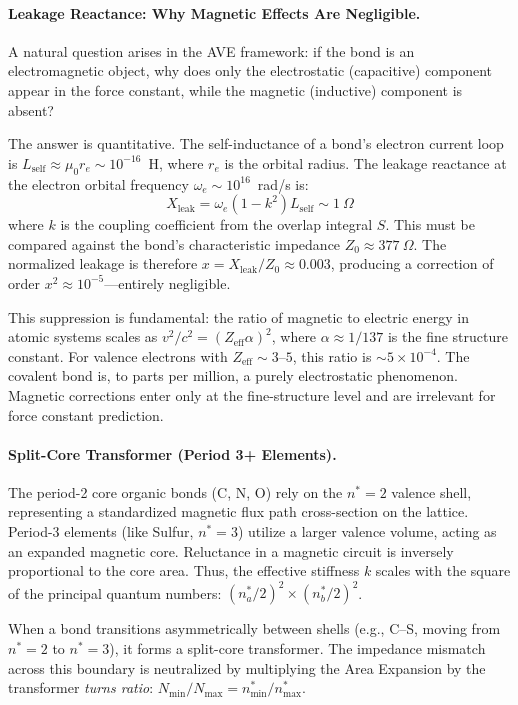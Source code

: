 \paragraph{Leakage Reactance: Why Magnetic Effects Are Negligible.}
A natural question arises in the AVE framework: if the bond is an electromagnetic object, why does only the electrostatic (capacitive) component appear in the force constant, while the magnetic (inductive) component is absent?

The answer is quantitative. The self-inductance of a bond's electron current loop is $L_\text{self} \approx \mu_0 r_e \sim 10^{-16}$~H, where $r_e$ is the orbital radius. The leakage reactance at the electron orbital frequency $\omega_e \sim 10^{16}$~rad/s is:
\begin{equation}
    X_\text{leak} = \omega_e (1 - k^2) L_\text{self} \sim 1~\Omega
    \label{eq:leakage_reactance}
\end{equation}
where $k$ is the coupling coefficient from the overlap integral $S$. This must be compared against the bond's characteristic impedance $Z_0 \approx 377~\Omega$. The normalized leakage is therefore $x = X_\text{leak}/Z_0 \approx 0.003$, producing a correction of order $x^2 \approx 10^{-5}$---entirely negligible.

This suppression is fundamental: the ratio of magnetic to electric energy in atomic systems scales as $v^2/c^2 = (Z_\text{eff} \alpha)^2$, where $\alpha \approx 1/137$ is the fine structure constant. For valence electrons with $Z_\text{eff} \sim 3\text{--}5$, this ratio is $\sim 5 \times 10^{-4}$. The covalent bond is, to parts per million, a purely electrostatic phenomenon. Magnetic corrections enter only at the fine-structure level and are irrelevant for force constant prediction.

\paragraph{Split-Core Transformer (Period 3+ Elements).}
The period-2 core organic bonds (C, N, O) rely on the $n^*=2$ valence shell, representing a standardized magnetic flux path cross-section on the lattice. Period-3 elements (like Sulfur, $n^*=3$) utilize a larger valence volume, acting as an expanded magnetic core. Reluctance in a magnetic circuit is inversely proportional to the core area. Thus, the effective stiffness $k$ scales with the square of the principal quantum numbers: $(n^*_a/2)^2 \times (n^*_b/2)^2$.

When a bond transitions asymmetrically between shells (e.g., C--S, moving from $n^*=2$ to $n^*=3$), it forms a split-core transformer. The impedance mismatch across this boundary is neutralized by multiplying the Area Expansion by the transformer \emph{turns ratio}: $N_\text{min} / N_\text{max} = n^*_\text{min} / n^*_\text{max}$.


